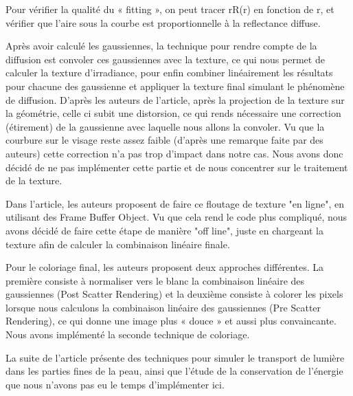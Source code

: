 \documentclass[12pt,a4paper]{article}
\begin{document}
Pour vérifier la qualité du « fitting », on peut tracer rR(r) en fonction de r, et vérifier que l’aire sous la courbe est proportionnelle à la reflectance diffuse.

Après avoir calculé les gaussiennes, la technique pour rendre compte de la diffusion est convoler ces gaussiennes avec la texture, ce qui nous permet de calculer la texture d’irradiance, pour enfin combiner linéairement les résultats pour chacune des gaussienne et appliquer la texture final simulant le phénomène de diffusion.  D’après les auteurs de l’article, après la projection de la texture sur la géométrie, celle ci subit une distorsion, ce qui rends nécessaire une correction (étirement) de la gaussienne avec laquelle nous allons la convoler. Vu que la courbure sur le visage reste assez faible (d’après une remarque faite par des auteurs)  cette correction n’a pas trop d’impact dans notre cas. Nous avons donc décidé de ne pas implémenter cette partie et de nous concentrer sur le traitement de la texture.

Dans l’article, les auteurs proposent de faire ce floutage de texture  "en ligne", en utilisant des Frame Buffer Object. Vu que cela rend le code plus compliqué, nous avons décidé de faire cette étape de manière "off line", juste en chargeant la texture afin de calculer  la combinaison linéaire finale.

Pour le coloriage final, les auteurs proposent deux approches différentes. La première consiste à normaliser vers le blanc la combinaison linéaire des gaussiennes (Post Scatter Rendering) et la deuxième consiste à colorer les pixels lorsque nous calculons la combinaison linéaire des gaussiennes (Pre Scatter Rendering), ce qui donne une image plus « douce » et aussi plus convaincante. Nous avons implémenté la seconde technique de coloriage.

La suite de l’article présente des techniques pour simuler le transport de lumière dans les parties fines de la peau, ainsi que l’étude de la conservation de l’énergie que nous n’avons pas eu le temps d’implémenter ici.
\end{document}
